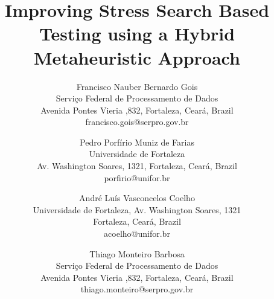 \documentclass[conference]{IEEEtran}
\begin{document}
%
\title{Improving Stress Search Based Testing using a Hybrid Metaheuristic Approach}



\author{ \alignauthor Francisco Nauber Bernardo Gois\\
Servi\c{c}o Federal de Processamento de Dados\\
Avenida Pontes Vieria ,832, Fortaleza, Cear\'a, Brazil\\
francisco.gois@serpro.gov.br\\
\and
\alignauthor Pedro Porf\'irio Muniz de Farias\\
Universidade de Fortaleza\\
Av. Washington Soares, 1321, Fortaleza, Cear\'a, Brazil\\
porfirio@unifor.br\\
\and
\alignauthor Andr\'e Lu\'is Vasconcelos Coelho\\
Universidade de Fortaleza, Av. Washington Soares, 1321\\
Fortaleza, Cear\'a, Brazil\\
acoelho@unifor.br\\
\and 
\alignauthor Thiago Monteiro Barbosa\\
Servi\c{c}o Federal de Processamento de Dados\\
Avenida Pontes Vieria ,832, Fortaleza, Cear\'a, Brazil\\
thiago.monteiro@serpro.gov.br
}
\end{document}
